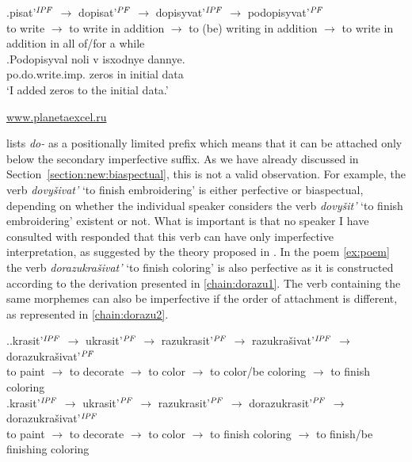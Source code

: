 \exg.\label{chain:podo}pisat'$^{\mathit{IPF}}$ $\rightarrow$ dopisat'$^{\mathit{PF}}$ $\rightarrow$ dopisyvat'$^{\mathit{IPF}}$ $\rightarrow$ podopisyvat'$^{\mathit{PF}}$\\
{to write} $\rightarrow$ {to write in addition} $\rightarrow$ {to (be) writing in addition} $\rightarrow$ {to write in addition in all of/for a while}\\

\exg.\label{ex:podopisyval}Podopisyval noli v isxodnye dannye.\\
po.do.write.imp. zeros in initial data\\
\vspace{0.5em}
`I added zeros to the initial data.'
\begin{flushright}
\vspace{-0.5em}
\url{www.planetaexcel.ru}
\end{flushright}

\citet{Tatevosov:09} lists \textit{do-} as a positionally limited prefix which means that it can be attached only below the secondary imperfective suffix. As we have already discussed in Section~\ref{section:new:biaspectual}, this is not a valid observation. For example, the verb \textit{dovy\v{s}ivat'} `to finish embroidering' is either perfective or biaspectual, depending on whether the individual speaker considers the verb \textit{dovy\v{s}it'} `to finish embroidering' existent or not. What is important is that no speaker I have consulted with responded that this verb can have only imperfective interpretation, as suggested by the theory proposed in \citealt{Tatevosov:09}. In the poem \ref{ex:poem} the verb \textit{dorazukra\v{s}ivat'} `to finish coloring' is also perfective as it is constructed according to the derivation presented in \ref{chain:dorazu1}. The verb containing the same morphemes can also be imperfective if the order of attachment is different, as represented in \ref{chain:dorazu2}.

\ex.\ag.\label{chain:dorazu1}krasit'$^{\mathit{IPF}}$ $\rightarrow$ ukrasit'$^{\mathit{PF}}$ $\rightarrow$ razukrasit'$^{\mathit{PF}}$ $\rightarrow$ razukra\v{s}ivat'$^{\mathit{IPF}}$ $\rightarrow$ dorazukra\v{s}ivat'$^{\mathit{PF}}$\\
{to paint} $\rightarrow$ {to decorate} $\rightarrow$ {to color} $\rightarrow$ {to color/be coloring} $\rightarrow$ {to finish coloring}\\
\bg.\label{chain:dorazu2}krasit'$^{\mathit{IPF}}$ $\rightarrow$ ukrasit'$^{\mathit{PF}}$ $\rightarrow$ razukrasit'$^{\mathit{PF}}$ $\rightarrow$ dorazukrasit'$^{\mathit{PF}}$ $\rightarrow$ dorazukra\v{s}ivat'$^{\mathit{IPF}}$\\
{to paint} $\rightarrow$ {to decorate} $\rightarrow$ {to color} $\rightarrow$ {to finish coloring} $\rightarrow$ {to finish/be finishing coloring}\\

